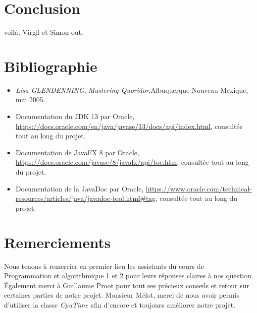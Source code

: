 \documentclass[a4paper, 12pt]{article}
\begin{document}
\section{Conclusion}

voilà, Virgil et Simon out.

\section{Bibliographie}
\begin{itemize}
\item \emph{Lisa GLENDENNING}, \textit{Mastering Quoridor},Albuquerque Nouveau Mexique, mai 2005.
\item Documentation du JDK 13 par Oracle, \url{https://docs.oracle.com/en/java/javase/13/docs/api/index.html}, consultée tout au long du projet.
\item Documentation de JavaFX 8 par Oracle, \url{https://docs.oracle.com/javase/8/javafx/api/toc.htm}, consultée tout au long du projet.
\item Documentation de la JavaDoc par Oracle, \url{https://www.oracle.com/technical-resources/articles/java/javadoc-tool.html#tag}, consultée tout au long du projet.
\end{itemize}

\section{Remerciements}

Nous tenons à remercier en premier lieu les assistants du cours de Programmation et algorithmique 1 et 2 pour leurs réponses claires à nos question.
Également merci à Guillaume Proot pour tout ses précieux conseils et retour sur certaines parties de notre projet.
Monsieur Mélot, merci de nous avoir permis d'utiliser la classe \textit{CpuTime} afin d'encore et toujours améliorer notre projet.
\end{document}
